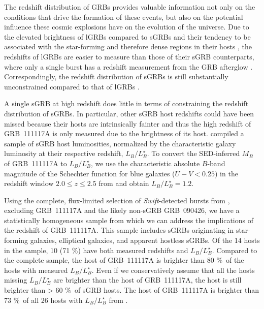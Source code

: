 \documentclass[longauth]{aa}    %
\begin{document}
The redshift distribution of GRBs provides valuable information not only on the conditions
that drive the formation of these events, but also on the potential influence
these cosmic explosions have on the evolution of the universe. Due to the
elevated brightness of lGRBs compared to sGRBs \citep{Berger2014} and their
tendency to be associated with the star-forming and therefore dense regions in
their hosts \citep{Fruchter2006, Lyman2017}, the redshifts of lGRBs are easier
to measure than those of their sGRB counterparts, where only a single burst has a redshift
measurement from the GRB afterglow \citep{Cucchiara2013, DeUgartePostigo2014b}.
Correspondingly, the redshift distribution of sGRBs is still substantially
unconstrained compared to that of lGRBs \citep[see, e.g., ][]{Jakobsson2012a,
        DAvanzo2015, Perley2016d}.

A single sGRB at high redshift does little in terms of constraining the redshift
distribution of sGRBs. In particular, other sGRB host redshifts could have been
missed because their hosts are intrinsically fainter and thus the high redshift
of GRB~111117A is only measured due to the brightness of its host.
\citet{Berger2014} compiled a sample of sGRB host luminosities, normalized by
the characteristic galaxy luminosity at their respective redshift,
$L_B/L^{\star}_{B}$. To convert the SED-inferred $M_B$ of GRB~111117A to
$L_B/L^{\star}_{B}$, we use the characteristic absolute $B$-band magnitude of
the Schechter function for blue galaxies ($U - V < 0.25$) in the redshift window
$2.0 \leq z \leq 2.5$ from \citet{Marchesini2007} and obtain $L_B/L^{\star}_{B}
= 1.2$.

Using the complete, flux-limited selection of \textit{Swift}-detected bursts
from \citet{DAvanzo2014a}, excluding GRB~111117A and the likely non-sGRB
GRB~090426, we have a statistically homogeneous sample from which we can address
the implications of the redshift of GRB~111117A. This sample includes sGRBs
originating in star-forming galaxies, elliptical galaxies, and apparent hostless
sGRBs. Of the 14 hosts in the sample, 10 (71 \%)  have both measured redshifts
and $L_B/L^{\star}_{B}$. Compared to the complete sample, the host of
GRB~111117A  is brighter than 80 \%\ of the hosts with measured
$L_B/L^{\star}_{B}$. Even if we conservatively assume that {all} the hosts
missing $L_B/L^{\star}_{B}$ are brighter than the host of GRB~111117A, the host
is still brighter than > 60 \%\ of sGRB hosts. The host of GRB~111117A is
brighter than 73 \%\ of all 26 hosts with $L_B/L^{\star}_{B}$ from
\citet{Berger2014}.
\end{document}
